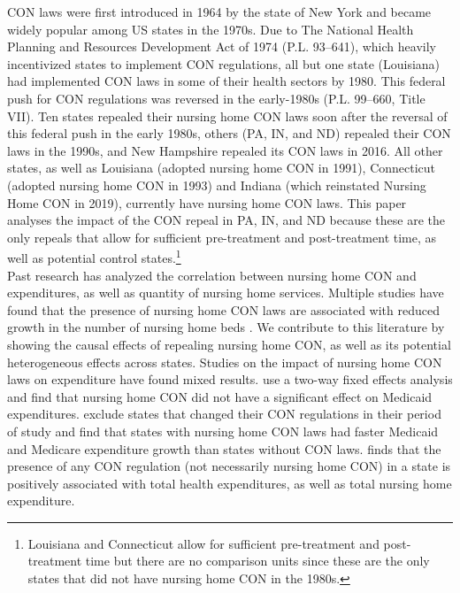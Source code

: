 \documentclass[../Main.tex]{subfiles}
\begin{document}
CON laws were first introduced in 1964 by the state of New York and became widely popular among US states in the 1970s. Due to The National Health Planning and Resources Development Act of 1974 (P.L. 93–641), which heavily incentivized states to implement CON regulations, all but one state (Louisiana) had implemented CON laws in some of their health sectors by 1980. This federal push for CON regulations was reversed in the early-1980s (P.L. 99–660, Title VII). Ten states repealed their nursing home CON laws soon after the reversal of this federal push in the early 1980s, others (PA, IN, and ND) repealed their CON laws in the 1990s, and New Hampshire repealed its CON laws in 2016. All other states, as well as Louisiana (adopted nursing home CON in 1991), Connecticut (adopted nursing home CON in 1993) and Indiana (which reinstated Nursing Home CON in 2019), currently have nursing home CON laws. This paper analyses the impact of the CON repeal in PA, IN, and ND because these are the only repeals that allow for sufficient pre-treatment and post-treatment time, as well as potential control states.\footnote{Louisiana and Connecticut allow for sufficient pre-treatment and post-treatment time but there are no comparison units since these are the only states that did not have nursing home CON in the 1980s.} \\
\indent Past research has analyzed the correlation between nursing home CON and expenditures, as well as quantity of nursing home services. Multiple studies have found that the presence of nursing home CON laws are associated with reduced growth in the number of nursing home beds \citep{harrington1997effect,swan1991certificate,zinn1994market}. We contribute to this literature by showing the causal effects of repealing nursing home CON, as well as its potential heterogeneous effects across states. Studies on the impact of nursing home CON laws on expenditure have found mixed results. \citet{grabowski2003effects} use a two-way fixed effects analysis and find that nursing home CON did not have a significant effect on Medicaid expenditures. \citet{rahman2016impact} exclude states that changed their CON regulations in their period of study and find that states with nursing home CON laws had faster Medicaid and Medicare expenditure growth than states without CON laws. \citet{bailey2019can} finds that the presence of any CON regulation (not necessarily nursing home CON) in a state is positively associated with total health expenditures, as well as total nursing home expenditure.\\
\end{document}
